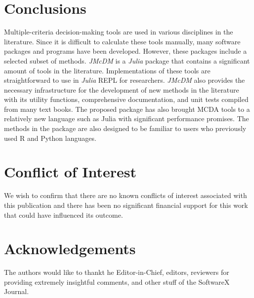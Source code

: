 \documentclass[preprint,review, 12pt, a4paper]{elsarticle}
\begin{document}
\section{Conclusions}
\label{section:conclusion}
Multiple-criteria decision-making tools are used in various disciplines in the literature. Since it is difficult to calculate these tools manually, many software packages and programs have been developed. However, these packages include a selected subset of methods. \emph{JMcDM} is a \emph{Julia} package that contains a significant amount of tools in the literature. Implementations of these tools are straightforward to use in \emph{Julia} REPL for researchers. \emph{JMcDM} also provides the necessary infrastructure for the development of new methods in the literature with its utility functions, comprehensive documentation, and unit tests compiled from many text books. The proposed package has also brought MCDA tools to a relatively new language such as Julia with significant performance promises. The methods in the package are also designed to be familiar to users who previously used R and Python languages.

\section{Conflict of Interest}
We wish to confirm that there are no known conflicts of interest associated with this publication and there has been no significant financial support for this work that could have influenced its outcome.


\section*{Acknowledgements}
\label{section:Acknowledgements}

The authors would like to thankt he Editor-in-Chief, editors, reviewers for providing extremely insightful comments, and other stuff  of the SoftwareX Journal.

\end{document}
